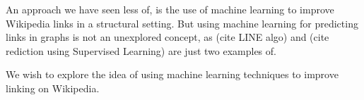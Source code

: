 An approach we have seen less of, is the use of machine learning to improve Wikipedia links in a structural setting. But using machine learning for predicting links in graphs is not an unexplored concept, as (cite LINE algo) and (cite rediction using Supervised Learning) are just two examples of.

We wish to explore the idea of using machine learning techniques to improve linking on Wikipedia.


